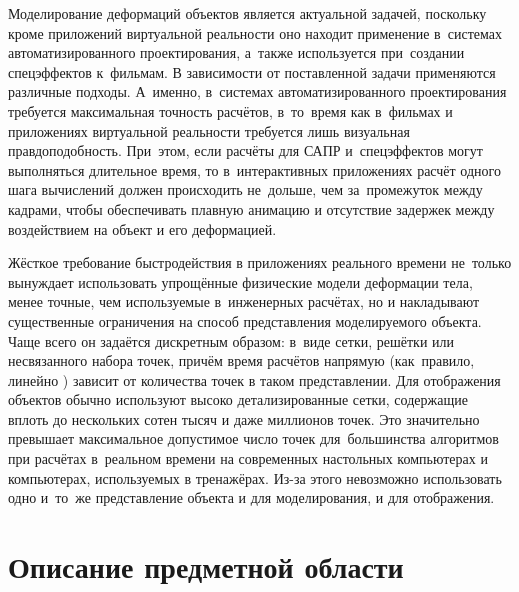 \documentclass[a4paper, 14pt, titlepage]{extarticle}
\let\oldsection\section
\renewcommand{\section}{\newpage\oldsection}
\begin{document}
    Моделирование деформаций объектов является актуальной задачей, поскольку кроме приложений
    виртуальной реальности оно находит применение в~системах автоматизированного проектирования, а~также используется
    при~создании спецэффектов к~фильмам. В зависимости от поставленной задачи применяются различные
    подходы. А~именно, в~системах автоматизированного проектирования требуется
    максимальная точность расчётов, в~то~время как в~фильмах и приложениях виртуальной реальности
    требуется лишь визуальная правдоподобность. При~этом, если расчёты для САПР и~спецэффектов могут
    выполняться длительное время, то в~интерактивных приложениях расчёт одного шага вычислений должен
    происходить не~дольше, чем за~промежуток между кадрами, чтобы обеспечивать плавную анимацию
    и отсутствие задержек между воздействием на объект и его деформацией.

    Жёсткое требование быстродействия в приложениях реального времени не~только вынуждает
    использовать упрощённые физические модели деформации тела, менее точные, чем используемые
    в~инженерных расчётах, но и накладывают существенные ограничения на способ представления
    моделируемого объекта. Чаще всего он задаётся дискретным образом: в~виде сетки, решётки или
    несвязанного набора точек, причём время расчётов напрямую (как~правило, линейно
    \cite{mueller-meshless}) зависит от количества точек в таком представлении. Для отображения
    объектов обычно используют высоко детализированные сетки, содержащие вплоть до нескольких
    сотен тысяч и даже миллионов точек. Это значительно превышает максимальное допустимое число точек для~большинства
    алгоритмов \cite{mueller-stable, mueller-meshless, chang-crash} при расчётах в~реальном времени на
    современных настольных компьютерах и компьютерах, используемых в тренажёрах. Из-за этого
    невозможно использовать одно и~то~же представление объекта и для моделирования, и для
    отображения.

  \section{Описание предметной области}\label{sec:domain}
\end{document}
